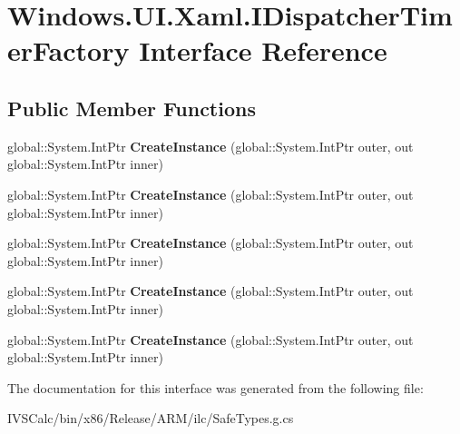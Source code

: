 \hypertarget{interface_windows_1_1_u_i_1_1_xaml_1_1_i_dispatcher_timer_factory}{}\section{Windows.\+U\+I.\+Xaml.\+I\+Dispatcher\+Timer\+Factory Interface Reference}
\label{interface_windows_1_1_u_i_1_1_xaml_1_1_i_dispatcher_timer_factory}
\subsection*{Public Member Functions}
\begin{DoxyCompactItemize}
\item 
\mbox{\label{interface_windows_1_1_u_i_1_1_xaml_1_1_i_dispatcher_timer_factory_ac2b056a844f85089dc42457cd3164d32}} 
global\+::\+System.\+Int\+Ptr {\bfseries Create\+Instance} (global\+::\+System.\+Int\+Ptr outer, out global\+::\+System.\+Int\+Ptr inner)
\item 
\mbox{\label{interface_windows_1_1_u_i_1_1_xaml_1_1_i_dispatcher_timer_factory_ac2b056a844f85089dc42457cd3164d32}} 
global\+::\+System.\+Int\+Ptr {\bfseries Create\+Instance} (global\+::\+System.\+Int\+Ptr outer, out global\+::\+System.\+Int\+Ptr inner)
\item 
\mbox{\label{interface_windows_1_1_u_i_1_1_xaml_1_1_i_dispatcher_timer_factory_ac2b056a844f85089dc42457cd3164d32}} 
global\+::\+System.\+Int\+Ptr {\bfseries Create\+Instance} (global\+::\+System.\+Int\+Ptr outer, out global\+::\+System.\+Int\+Ptr inner)
\item 
\mbox{\label{interface_windows_1_1_u_i_1_1_xaml_1_1_i_dispatcher_timer_factory_ac2b056a844f85089dc42457cd3164d32}} 
global\+::\+System.\+Int\+Ptr {\bfseries Create\+Instance} (global\+::\+System.\+Int\+Ptr outer, out global\+::\+System.\+Int\+Ptr inner)
\item 
\mbox{\label{interface_windows_1_1_u_i_1_1_xaml_1_1_i_dispatcher_timer_factory_ac2b056a844f85089dc42457cd3164d32}} 
global\+::\+System.\+Int\+Ptr {\bfseries Create\+Instance} (global\+::\+System.\+Int\+Ptr outer, out global\+::\+System.\+Int\+Ptr inner)
\end{DoxyCompactItemize}


The documentation for this interface was generated from the following file\+:\begin{DoxyCompactItemize}
\item 
I\+V\+S\+Calc/bin/x86/\+Release/\+A\+R\+M/ilc/Safe\+Types.\+g.\+cs\end{DoxyCompactItemize}
